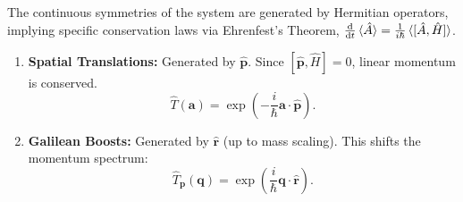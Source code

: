 The continuous symmetries of the system are generated by Hermitian operators,
implying specific conservation laws via Ehrenfest's Theorem,
$\frac{\mathrm{d}}{\mathrm{d}t}\braket{\hat{A}} = \frac{1}{i\hbar}\braket{[\hat{A},
\hat{H}]}$.

\begin{enumerate}
  \item \textbf{Spatial Translations:} Generated by $\hat{\mathbf{p}}$. Since
    $[\hat{\mathbf{p}}, \hat{H}] = 0$, linear momentum is conserved.
    \begin{equation}
      \hat{T}(\mathbf{a}) = \exp\left( -\frac{i}{\hbar} \mathbf{a} \cdot
      \hat{\mathbf{p}} \right).
    \end{equation}
  \item \textbf{Galilean Boosts:} Generated by $\hat{\mathbf{r}}$ (up to mass
    scaling). This shifts the momentum spectrum:
    \begin{equation}
      \hat{T}_{\mathbf{p}}(\mathbf{q}) = \exp\left( \frac{i}{\hbar}
      \mathbf{q} \cdot \hat{\mathbf{r}} \right).
    \end{equation}
\end{enumerate}

